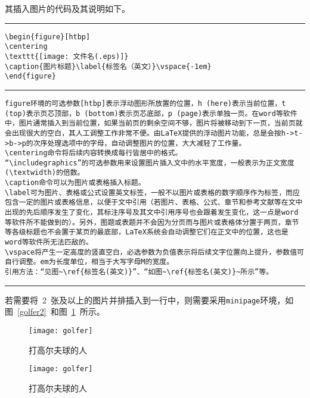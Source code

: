 其插入图片的代码及其说明如下。
\vspace{1em}\noindent\hrule
\begin{lstlisting}
\begin{figure}[htbp]
\centering
\texttt{[image: 文件名(.eps)]}
\caption{图片标题}\label{标签名（英文）}\vspace{-1em}
\end{figure}
\end{lstlisting}
\noindent\hrule
\begin{lstlisting}
figure环境的可选参数[htbp]表示浮动图形所放置的位置，h (here)表示当前位置，t (top)表示页芯顶部，b (bottom)表示页芯底部，p (page)表示单独一页。在word等软件中，图片通常插入到当前位置，如果当前页的剩余空间不够，图片将被移动到下一页，当前页就会出现很大的空白，其人工调整工作非常不便。由LaTeX提供的浮动图片功能，总是会按h->t->b->p的次序处理选项中的字母，自动调整图片的位置，大大减轻了工作量。
\centering命令将后续内容转换成每行皆居中的格式。
“\includegraphics”的可选参数用来设置图片插入文中的水平宽度，一般表示为正文宽度(\textwidth)的倍数。
\caption命令可以为图片或表格插入标题。
\label可为图片、表格或公式设置英文标签，一般不以图片或表格的数字顺序作为标签，而应包含一定的图片或表格信息，以便于文中引用（若图片、表格、公式、章节和参考文献等在文中出现的先后顺序发生了变化，其标注序号及其文中引用序号也会跟着发生变化，这一点是word等软件所不能做到的）。另外，图题或表题并不会因为分页而与图片或表格体分置于两页，章节等各级标题也不会置于某页的最底部，LaTeX系统会自动调整它们在正文中的位置，这也是word等软件所无法匹敌的。
\vspace将产生一定高度的竖直空白，必选参数为负值表示将后续文字位置向上提升，参数值可自行调整。em为长度单位，相当于大写字母M的宽度。
引用方法：“见图~\ref{标签名(英文)}”、“如图~\ref{标签名(英文)}~所示”等。
\end{lstlisting}
\noindent\hrule\vspace{1em}
若需要将~2~张及以上的图片并排插入到一行中，则需要采用\verb|minipage|环境，如图~\ref{golfer2}~和图~\ref{golfer3}~所示。
\begin{figure}[htbp]
\centering
\begin{minipage}{0.4\textwidth}
\centering
\texttt{[image: golfer]}
\caption{打高尔夫球的人}\label{golfer2}
\end{minipage}
\begin{minipage}{0.4\textwidth}
\centering
\texttt{[image: golfer]}
\caption{打高尔夫球的人}\label{golfer3}
\end{minipage}\vspace{-1em}
\end{figure}


